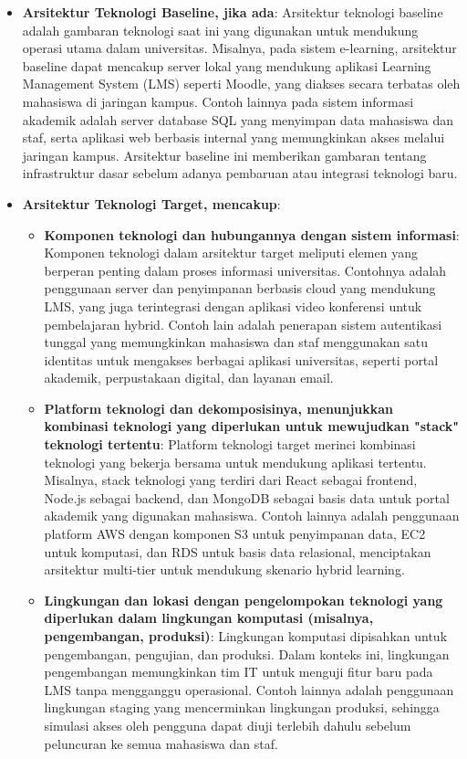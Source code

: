 \begin{itemize}
	\item \textbf{Arsitektur Teknologi Baseline, jika ada}: Arsitektur teknologi baseline adalah gambaran teknologi saat ini yang digunakan untuk mendukung operasi utama dalam universitas. Misalnya, pada sistem e-learning, arsitektur baseline dapat mencakup server lokal yang mendukung aplikasi Learning Management System (LMS) seperti Moodle, yang diakses secara terbatas oleh mahasiswa di jaringan kampus. Contoh lainnya pada sistem informasi akademik adalah server database SQL yang menyimpan data mahasiswa dan staf, serta aplikasi web berbasis internal yang memungkinkan akses melalui jaringan kampus. Arsitektur baseline ini memberikan gambaran tentang infrastruktur dasar sebelum adanya pembaruan atau integrasi teknologi baru.
	
	\item \textbf{Arsitektur Teknologi Target, mencakup}:
	\begin{itemize}
		\item \textbf{Komponen teknologi dan hubungannya dengan sistem informasi}: Komponen teknologi dalam arsitektur target meliputi elemen yang berperan penting dalam proses informasi universitas. Contohnya adalah penggunaan server dan penyimpanan berbasis cloud yang mendukung LMS, yang juga terintegrasi dengan aplikasi video konferensi untuk pembelajaran hybrid. Contoh lain adalah penerapan sistem autentikasi tunggal yang memungkinkan mahasiswa dan staf menggunakan satu identitas untuk mengakses berbagai aplikasi universitas, seperti portal akademik, perpustakaan digital, dan layanan email.
		
		\item \textbf{Platform teknologi dan dekomposisinya, menunjukkan kombinasi teknologi yang diperlukan untuk mewujudkan "stack" teknologi tertentu}: Platform teknologi target merinci kombinasi teknologi yang bekerja bersama untuk mendukung aplikasi tertentu. Misalnya, stack teknologi yang terdiri dari React sebagai frontend, Node.js sebagai backend, dan MongoDB sebagai basis data untuk portal akademik yang digunakan mahasiswa. Contoh lainnya adalah penggunaan platform AWS dengan komponen S3 untuk penyimpanan data, EC2 untuk komputasi, dan RDS untuk basis data relasional, menciptakan arsitektur multi-tier untuk mendukung skenario hybrid learning.
		
		\item \textbf{Lingkungan dan lokasi dengan pengelompokan teknologi yang diperlukan dalam lingkungan komputasi (misalnya, pengembangan, produksi)}: Lingkungan komputasi dipisahkan untuk pengembangan, pengujian, dan produksi. Dalam konteks ini, lingkungan pengembangan memungkinkan tim IT untuk menguji fitur baru pada LMS tanpa mengganggu operasional. Contoh lainnya adalah penggunaan lingkungan staging yang mencerminkan lingkungan produksi, sehingga simulasi akses oleh pengguna dapat diuji terlebih dahulu sebelum peluncuran ke semua mahasiswa dan staf.
		

\end{itemize}
\end{itemize}

